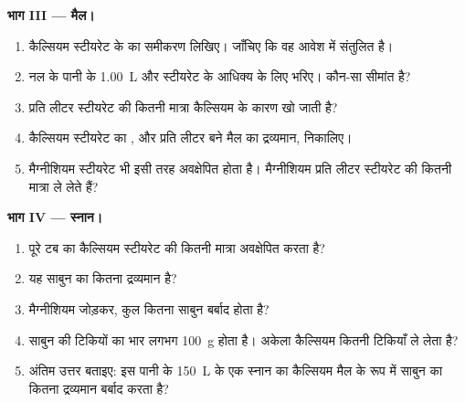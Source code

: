 \begin{problem}
\medskip
\noindent\textbf{भाग III --- मैल।}
\begin{enumerate}[resume]
  \item कैल्सियम स्टीयरेट के  का समीकरण लिखिए।
        जाँचिए कि वह आवेश में संतुलित है।
  \item नल के पानी के \qty{1.00}{L} और स्टीयरेट  के
        आधिक्य के लिए  भरिए। कौन-सा  सीमांत है?
  \item प्रति लीटर स्टीयरेट  की कितनी मात्रा कैल्सियम के कारण खो जाती है?
  \item कैल्सियम स्टीयरेट का , और प्रति लीटर बने मैल का द्रव्यमान,
        निकालिए।
  \item मैग्नीशियम स्टीयरेट भी इसी तरह अवक्षेपित होता है। मैग्नीशियम  प्रति लीटर
        स्टीयरेट की कितनी मात्रा ले लेते हैं?
\end{enumerate}

\medskip
\noindent\textbf{भाग IV --- स्नान।}
\begin{enumerate}[resume]
  \item पूरे टब का कैल्सियम स्टीयरेट  की कितनी मात्रा
        अवक्षेपित करता है?
  \item यह साबुन का कितना द्रव्यमान है?
  \item मैग्नीशियम जोड़कर, कुल कितना साबुन बर्बाद होता है?
  \item साबुन की टिकियों का भार लगभग \qty{100}{g} होता है। अकेला कैल्सियम कितनी
        टिकियाँ ले लेता है?
  \item अंतिम उत्तर बताइए: इस पानी के \qty{150}{L} के एक स्नान का कैल्सियम
        मैल के रूप में साबुन का कितना द्रव्यमान बर्बाद करता है?
\end{enumerate}
\end{problem}
